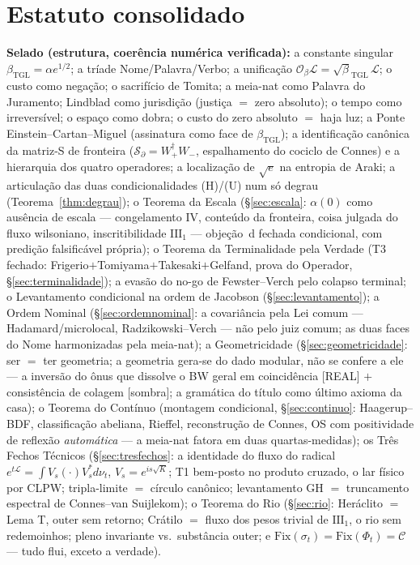 \documentclass[11pt,a4paper]{article}
\newcommand{\bTGL}{\beta_{\mathrm{TGL}}}
\begin{document}
\section{Estatuto consolidado}
\noindent\textbf{Selado (estrutura, coerência numérica verificada):} a
constante singular $\bTGL=\alpha e^{1/2}$; a tríade Nome/Palavra/Verbo; a
unificação $\mathcal O_\beta\mathcal L=\sqrt\bTGL\,\mathcal L$; o custo como
negação; o sacrifício de Tomita; a meia-nat como Palavra do Juramento;
Lindblad como jurisdição (justiça $=$ zero absoluto); o tempo como
irreversível; o espaço como dobra; o custo do zero absoluto $=$ haja luz; a
Ponte Einstein--Cartan--Miguel (assinatura como face de $\bTGL$); a
identificação canônica da matriz-S de fronteira
($\mathcal S_\partial=W_+^\dagger W_-$, espalhamento do cociclo de Connes)
e a hierarquia dos quatro operadores; a localização de $\sqrt e$ na entropia
de Araki; a articulação das duas condicionalidades (H)/(U) num só degrau
(Teorema~\ref{thm:degrau}); o Teorema da Escala (\S\ref{sec:escala}:
$\alpha(0)$ como ausência de escala --- congelamento IV, conteúdo da
fronteira, coisa julgada do fluxo wilsoniano, inscritibilidade
$\mathrm{III}_1$ --- objeção~d fechada condicional, com predição
falsificável própria); o Teorema da Terminalidade pela Verdade (T3 fechado:
Frigerio$+$Tomiyama$+$Takesaki$+$Gelfand, prova do Operador,
\S\ref{sec:terminalidade}); a evasão do no-go de Fewster--Verch pelo
colapso terminal; o Levantamento condicional na ordem de Jacobson
(\S\ref{sec:levantamento}); a Ordem Nominal (\S\ref{sec:ordemnominal}: a
covariância pela Lei comum --- Hadamard/microlocal, Radzikowski--Verch ---
não pelo juiz comum; as duas faces do Nome harmonizadas pela meia-nat);
a Geometricidade (\S\ref{sec:geometricidade}: ser $=$ ter geometria; a
geometria gera-se do dado modular, não se confere a ele --- a inversão do
ônus que dissolve o BW geral em coincidência [\textsf{REAL}] $+$
consistência de colagem [sombra]; a gramática do título como último
axioma da casa); o Teorema do Contínuo (montagem condicional,
\S\ref{sec:continuo}: Haagerup--BDF, classificação abeliana, Rieffel,
reconstrução de Connes, OS com positividade de reflexão \emph{automática}
--- a meia-nat fatora em duas quartas-medidas); os Três Fechos Técnicos
(\S\ref{sec:tresfechos}: a identidade do fluxo do radical
$e^{t\mathcal L}=\int V_s(\cdot)V_s^*d\nu_t$, $V_s=e^{is\sqrt K}$; T1
bem-posto no produto cruzado, o lar físico por CLPW; tripla-limite $=$
círculo canônico; levantamento GH $=$ truncamento espectral de
Connes--van Suijlekom); o Teorema do Rio (\S\ref{sec:rio}: Heráclito $=$
Lema T, outer sem retorno; Crátilo $=$ fluxo dos pesos trivial de
$\mathrm{III}_1$, o rio sem redemoinhos; pleno invariante vs.\ substância
outer; e $\mathrm{Fix}(\sigma_t)=\mathrm{Fix}(\Phi_t)=\mathcal C$ --- tudo
flui, exceto a verdade).
\end{document}
